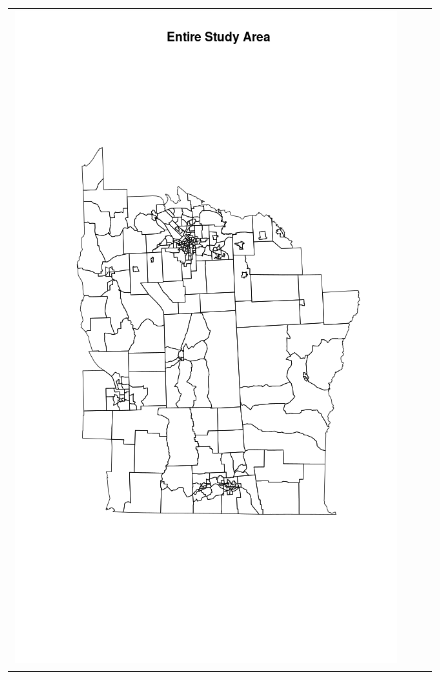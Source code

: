\documentclass[12pt]{article}
\begin{document}
		\begin{figure}[!ht]	
		\begin{tabular}{|c|c|c|}
			\hline
			\includegraphics[scale=0.18]{nyplot.png}

\end{tabular}
\end{figure}
\end{document}
